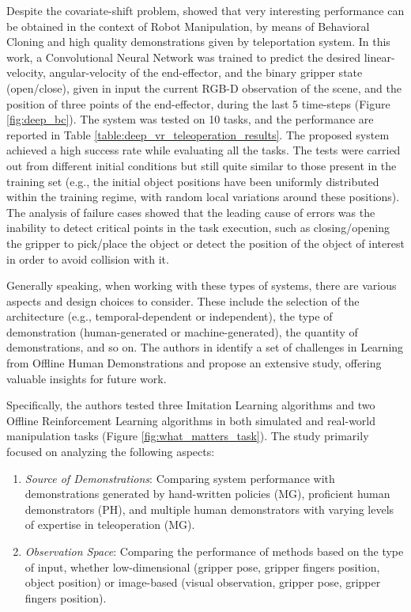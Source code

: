 Despite the covariate-shift problem, \cite{zhang2018deep_vr_teleoperation} showed that very interesting performance can be obtained in the context of Robot Manipulation, by means of Behavioral Cloning and high quality demonstrations given by teleportation system. In this work, a Convolutional Neural Network was trained to predict the desired linear-velocity, angular-velocity of the end-effector, and the binary gripper state (open/close), given in input the current RGB-D observation of the scene, and the position of three points of the end-effector, during the last 5 time-steps (Figure \ref{fig:deep_bc}). The system was tested on 10 tasks, and the performance are reported in Table \ref{table:deep_vr_teleoperation_results}. The proposed system achieved a high success rate while evaluating all the tasks. The tests were carried out from different initial conditions but still quite similar to those present in the training set (e.g., the initial object positions have been uniformly distributed within the training regime, with random local variations around these positions). The analysis of failure cases showed that the leading cause of errors was the inability to detect critical points in the task execution, such as closing/opening the gripper to pick/place the object or detect the position of the object of interest in order to avoid collision with it.


Generally speaking, when working with these types of systems, there are various aspects and design choices to consider. These include the selection of the architecture (e.g., temporal-dependent or independent), the type of demonstration (human-generated or machine-generated), the quantity of demonstrations, and so on. The authors in \cite{mandlekar2022matters} identify a set of challenges in Learning from Offline Human Demonstrations and propose an extensive study, offering valuable insights for future work.

Specifically, the authors tested three Imitation Learning algorithms and two Offline Reinforcement Learning algorithms in both simulated and real-world manipulation tasks (Figure \ref{fig:what_matters_task}). The study primarily focused on analyzing the following aspects:

\begin{enumerate}
    \item \textit{Source of Demonstrations}: Comparing system performance with demonstrations generated by hand-written policies (MG), proficient human demonstrators (PH), and multiple human demonstrators with varying levels of expertise in teleoperation (MG).
    \item \textit{Observation Space}: Comparing the performance of methods based on the type of input, whether low-dimensional (gripper pose, gripper fingers position, object position) or image-based (visual observation, gripper pose, gripper fingers position).
\end{enumerate}


